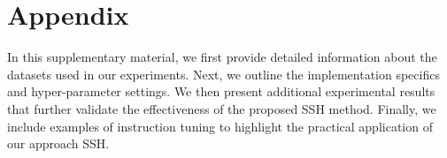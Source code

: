 \section{Appendix}
\label{appendix}

In this supplementary material, we first provide detailed information about the datasets used in our experiments. Next, we outline the implementation specifics and hyper-parameter settings. We then present additional experimental results that further validate the effectiveness of the proposed SSH method. Finally, we include examples of instruction tuning to highlight the practical application of our approach SSH.




